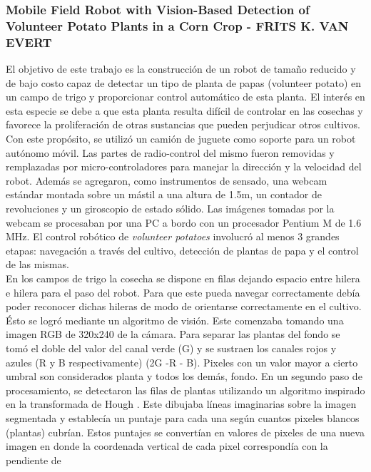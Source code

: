 	\subsubsection{\label{volunteer}Mobile Field Robot with Vision-Based Detection of Volunteer Potato Plants in a Corn Crop - FRITS K. VAN EVERT}
	El objetivo de este trabajo es la construcci\'on de un robot de 
	tama\~no reducido y de bajo costo capaz de detectar un tipo de 
	planta de papas (volunteer potato) en un campo de trigo y proporcionar control autom\'atico de esta planta. El inter\'es en 
	esta especie se debe a que esta planta resulta dif\'icil de controlar en las cosechas y favorece la 
	proliferaci\'on de otras sustancias que pueden perjudicar otros 
	cultivos. Con este prop\'osito, se utiliz\'o un cami\'on de juguete como 
	soporte para un robot aut\'onomo m\'ovil. Las partes de 
	radio-control del mismo fueron 
	removidas y remplazadas por micro-controladores para manejar la 
	direcci\'on y la velocidad del robot. Adem\'as se agregaron, como instrumentos de 
	sensado, una webcam est\'andar montada sobre un m\'astil a 
	una altura de 1.5m, un contador de revoluciones y un giroscopio de 
	estado s\'olido. Las im\'agenes tomadas por la webcam se procesaban 
	por una PC a bordo con un procesador Pentium M de 1.6 MHz. El control rob\'otico de \emph{volunteer potatoes} 
	involucr\'o al menos 3 grandes etapas: navegaci\'on a trav\'es del cultivo, detecci\'on 
	de plantas de papa y el control de las mismas.\\
	\indent En los campos de trigo la cosecha se dispone en filas 
	dejando espacio entre hilera e hilera para el paso del robot. Para 
	que este pueda navegar correctamente deb\'ia poder reconocer dichas 
	hileras de modo de orientarse correctamente en el cultivo. \'Esto se 
	logr\'o mediante un algoritmo de visi\'on. Este comenzaba 
	tomando una imagen RGB de 320x240 de la c\'amara. Para separar las 
	plantas del fondo se tom\'o el doble del valor del canal verde (G)  y se 
	sustraen los canales rojos y azules (R y B respectivamente) (2G -R - B). Pixeles con un 
	valor mayor a cierto umbral son considerados planta y todos los 
	dem\'as, fondo. En un segundo paso de procesamiento, se detectaron las 
	filas de plantas utilizando un algoritmo inspirado en la 
	transformada de Hough \cite{hough62}. Este dibujaba l\'ineas imaginarias sobre la 
	imagen segmentada y establec\'ia un puntaje para cada una seg\'un 
	cuantos pixeles blancos (plantas) cubr\'ian. Estos puntajes se 
	convert\'ian en valores de pixeles de una nueva imagen en donde la 
	coordenada vertical de cada pixel correspond\'ia con la pendiente de 
